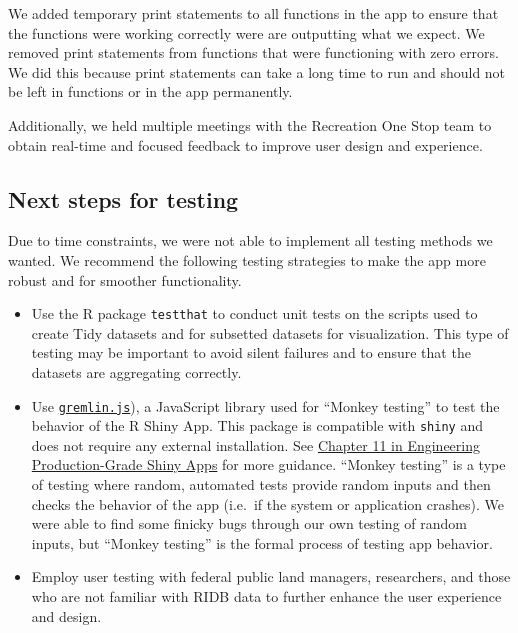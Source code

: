\documentclass[
]{book}
\providecommand{\tightlist}{%
  \setlength{\itemsep}{0pt}\setlength{\parskip}{0pt}}
\begin{document}
We added temporary print statements to all functions in the app to ensure that the functions were working correctly were are outputting what we expect. We removed print statements from functions that were functioning with zero errors. We did this because print statements can take a long time to run and should not be left in functions or in the app permanently.

Additionally, we held multiple meetings with the Recreation One Stop team to obtain real-time and focused feedback to improve user design and experience.

\hypertarget{next-steps-for-testing}{%
\subsection{Next steps for testing}\label{next-steps-for-testing}}

Due to time constraints, we were not able to implement all testing methods we wanted. We recommend the following testing strategies to make the app more robust and for smoother functionality.

\begin{itemize}
\tightlist
\item
  Use the R package \texttt{testthat} \citep{R-testthat} to conduct unit tests on the scripts used to create Tidy datasets and for subsetted datasets for visualization. This type of testing may be important to avoid silent failures and to ensure that the datasets are aggregating correctly.
\item
  Use \href{https://github.com/marmelab/gremlins.js}{\texttt{gremlin.js}}), a JavaScript library used for ``Monkey testing'' to test the behavior of the R Shiny App. This package is compatible with \texttt{shiny} \citep{R-shiny} and does not require any external installation. See \href{https://engineering-shiny.org/build-yourself-safety-net.html}{Chapter 11 in Engineering Production-Grade Shiny Apps} for more guidance. ``Monkey testing'' is a type of testing where random, automated tests provide random inputs and then checks the behavior of the app (i.e.~if the system or application crashes). We were able to find some finicky bugs through our own testing of random inputs, but ``Monkey testing'' is the formal process of testing app behavior.
\item
  Employ user testing with federal public land managers, researchers, and those who are not familiar with RIDB data to further enhance the user experience and design.
\end{itemize}
\end{document}
